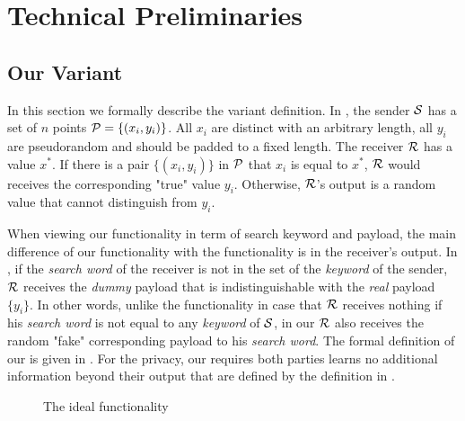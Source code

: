 \section{Technical Preliminaries}
\label{sect:prelims}

\subsection{Our \SSOT Variant}
\label{sec:ssotfunc}

In this section we formally describe the variant \OPPRF definition. In \OPPRF, the sender $\SS$  has a set of $n$ points $\P = \{ (x_i, y_i) \}$. All $x_i$ are distinct with an arbitrary length, all $y_i$ are pseudorandom and should be padded to a fixed length. The receiver $\RR$ has a value $x^*$. If there is a pair $\{ (x_i, y_i) \}$ in $\P$ that $x_i$ is equal to $x^*$, $\RR$ would receives the corresponding "true" value $y_i$. Otherwise, $\RR$'s output is a random value that cannot distinguish from $y_i$.

When viewing our \OPPRF functionality in term of search keyword and payload, the main difference of our \OPPRF functionality with the \KS\cite{TCC:FIPR05} functionality is in the receiver's output. In \OPPRF, if the \textit{search word} of the receiver is not in the set of the \textit{keyword} of the sender, $\RR$ receives the \textit{dummy} payload that is indistinguishable with the \textit{real} payload $\{y_i\}$. In other words, unlike the \KS functionality\cite{TCC:FIPR05} in case that $\RR$ receives nothing if his \textit{search word} is not equal to any \textit{keyword} of $\SS$, in our \OPPRF  $\RR$ also receives the random "fake" corresponding payload to his \textit{search word}. The formal definition of our \OPPRF is given in  
. For the privacy, our \OPPRF requires both parties learns no additional information beyond their output that are defined by the definition in . 


\begin{figure}[htb]\centering
	\caption{The \OPPRF ideal functionality}
	\label{fig:1ssotfunc}
\end{figure} 

